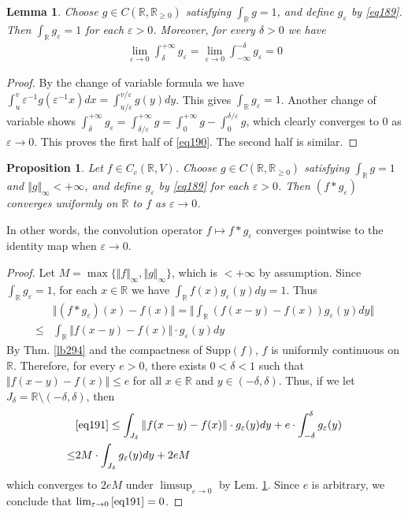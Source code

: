 \documentclass[12pt,b5paper,notitlepage]{article}
\theoremstyle{definition}
\theoremstyle{plain}
\newtheorem{pp}[df]{Proposition}
\newtheorem{lm}[df]{Lemma}
\newcommand{\Rbb}{\mathbb R}
\newcommand{\Supp}{\mathrm{Supp}}
\newcommand{\eps}{\varepsilon}
\numberwithin{equation}{section}
\begin{document}
\begin{lm}\label{lb436}
Choose $g\in C(\Rbb,\Rbb_{\geq0})$ satisfying $\int_\Rbb g=1$, and define $g_\eps$ by \eqref{eq189}. Then $\int_\Rbb g_\eps=1$ for each $\eps>0$. Moreover, for every $\delta>0$ we have
\begin{align}
\lim_{\eps\rightarrow0}\int_\delta^{+\infty} g_\eps=\lim_{\eps\rightarrow0}\int_{-\infty}^{-\delta}g_\eps=0 \label{eq190}
\end{align}
\end{lm}


\begin{proof}
By the change of variable formula we have $\int_u^v \eps^{-1}g(\eps^{-1}x)dx=\int_{u/\eps}^{v/\eps}g(y)dy$. This gives $\int_\Rbb g_\eps=1$. Another change of variable shows $\int_\delta^{+\infty}g_\eps=\int_{\delta/\eps}^{+\infty}g=\int_0^{+\infty}g-\int_0^{\delta/\eps}g$, which clearly converges to $0$ as $\eps\rightarrow0$. This proves the first half of \eqref{eq190}. The second half is similar.
\end{proof}


\begin{pp}\label{lb437}
Let $f\in C_c(\Rbb,V)$. Choose $g\in C(\Rbb,\Rbb_{\geq0})$ satisfying $\int_\Rbb g=1$ and $\Vert g\Vert_\infty<+\infty$, and define $g_\eps$ by \eqref{eq189} for each $\eps>0$. Then $(f*g_\eps)$ converges uniformly on $\Rbb$ to $f$ as $\eps\rightarrow0$.
\end{pp}

In other words, the convolution operator $f\mapsto f*g_\eps$ converges pointwise to the identity map when $\eps\rightarrow 0$.

\begin{proof}
Let $M=\max\{\Vert f\Vert_\infty,\Vert g\Vert_\infty\}$, which is $<+\infty$ by assumption. Since $\int_\Rbb g_\eps=1$, for each $x\in\Rbb$ we have $\int_\Rbb f(x)g_\eps(y)dy=1$. Thus
\begin{align}
&\Vert (f*g_\eps)(x)-f(x)\Vert=\Big\Vert \int_\Rbb(f(x-y)-f(x))g_\eps(y)dy \Big\Vert\nonumber\\
\leq &\int_\Rbb  \Vert f(x-y)-f(x)\Vert \cdot g_\eps(y)dy \label{eq191}
\end{align}
By Thm. \ref{lb294} and the compactness of $\Supp(f)$, $f$ is uniformly continuous on $\Rbb$. Therefore, for every $e>0$, there exists $0<\delta<1$ such that $\Vert f(x-y)-f(x)\Vert\leq e$ for all $x\in\Rbb$ and $y\in(-\delta,\delta)$. Thus, if we let $J_\delta=\Rbb\setminus(-\delta,\delta)$, then
\begin{align*}
&\eqref{eq191}\leq \int_{J_\delta}\Vert f(x-y)-f(x)\Vert \cdot g_\eps(y)dy+e\cdot \int_{-\delta}^\delta g_\eps(y)\\
\leq& 2M\cdot \int_{J_\delta} g_\eps(y)dy+2eM 
\end{align*}
which converges to $2eM$ under $\limsup_{\eps\rightarrow0}$ by Lem. \ref{lb436}. Since $e$ is arbitrary, we conclude that $\lim_{\eps\rightarrow0}\eqref{eq191}=0$.
\end{proof}
\end{document}
